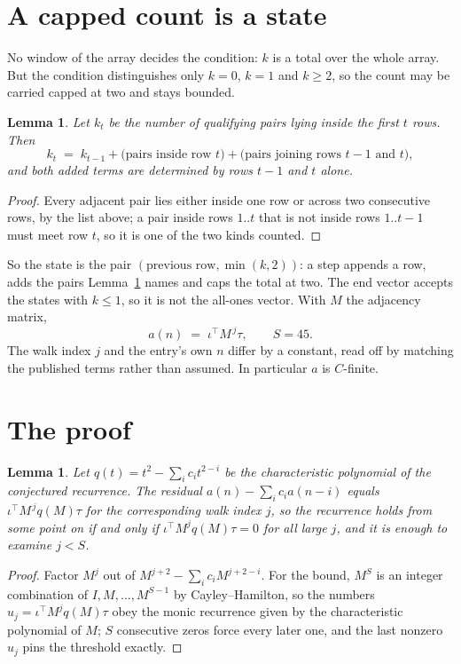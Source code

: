 \documentclass[11pt,a4paper]{article}
\theoremstyle{plain}
\newtheorem{lemma}[theorem]{Lemma}
\theoremstyle{definition}
\begin{document}
\section{A capped count is a state}

No window of the array decides the condition: $k$ is a total over the whole array. But the
condition distinguishes only $k=0$, $k=1$ and $k\ge2$, so the count may be carried capped at
two and stays bounded.

\begin{lemma}\label{lem:cap}
Let $k_t$ be the number of qualifying pairs lying inside the first $t$ rows. Then
\[
k_{t}\;=\;k_{t-1}+\bigl(\text{pairs inside row } t\bigr)
+\bigl(\text{pairs joining rows } t-1 \text{ and } t\bigr),
\]
and both added terms are determined by rows $t-1$ and $t$ alone.
\end{lemma}

\begin{proof}
Every adjacent pair lies either inside one row or across two consecutive rows, by the list
above; a pair inside rows $1..t$ that is not inside rows $1..t-1$ must meet row $t$, so it is
one of the two kinds counted.
\end{proof}

So the state is the pair $(\text{previous row},\min(k,2))$: a step appends a row, adds the
pairs Lemma~\ref{lem:cap} names and caps the total at two. The end vector accepts the states
with $k\le1$, so it is not the all-ones vector. With $M$ the adjacency matrix,
\[
a(n)\;=\;\iota^{\!\top}M^{\,j}\tau ,\qquad S=45.
\]
The walk index $j$ and the entry's own $n$ differ by a constant, read off by matching the
published terms rather than assumed. In particular $a$ is $C$-finite.

\section{The proof}

\begin{lemma}\label{lem:crit}
Let $q(t)=t^{2}-\sum_i c_it^{2-i}$ be the characteristic polynomial of the
conjectured recurrence. The residual $a(n)-\sum_ic_ia(n-i)$ equals
$\iota^{\!\top}M^{\,j}q(M)\tau$ for the corresponding walk index $j$, so the recurrence
holds from some point on if and only if $\iota^{\!\top}M^{j}q(M)\tau=0$ for all large $j$,
and it is enough to examine $j<S$.
\end{lemma}

\begin{proof}
Factor $M^{j}$ out of $M^{j+2}-\sum_ic_iM^{j+2-i}$. For the bound, $M^{S}$
is an integer combination of $I,M,\dots,M^{S-1}$ by Cayley--Hamilton, so the numbers
$u_j=\iota^{\!\top}M^{j}q(M)\tau$ obey the monic recurrence given by the characteristic
polynomial of $M$; $S$ consecutive zeros force every later one, and the last nonzero $u_j$
pins the threshold exactly.
\end{proof}
\end{document}
